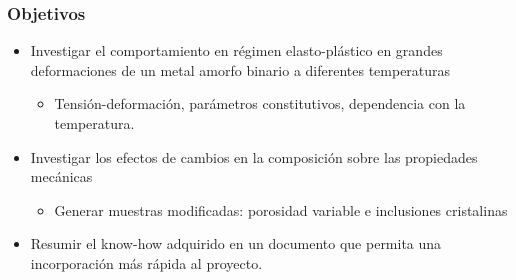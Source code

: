 \begin{frame}
 \frametitle{Objetivos}
\begin{itemize}
 \item Investigar el comportamiento en r\'egimen elasto-pl\'astico en grandes deformaciones de un metal amorfo binario a diferentes temperaturas
 \begin{itemize}
  \item Tensión-deformación, parámetros constitutivos, dependencia con la temperatura.
 \end{itemize}
 \item Investigar los efectos de cambios en la composici\'on sobre las propiedades mec\'anicas
 \begin{itemize}
  \item Generar muestras modificadas: porosidad variable e inclusiones cristalinas
 \end{itemize}
 \item Resumir el know-how adquirido en un documento que permita una incorporación más rápida al proyecto.
\end{itemize}
\end{frame}

